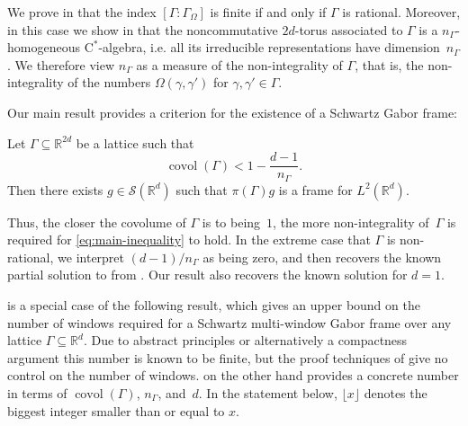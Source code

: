 \documentclass[reqno, a4paper]{amsart}
\numberwithin{equation}{section}
\newcommand{\R}{\mathbb{R}}   %
\newcommand{\ca}{$\mathrm{C}^*$-algebra}
\DeclareMathOperator{\covol}{covol}
\def\subgroup#1{{#1}_\Omega}
\begin{document}
We prove in  that the index $[\Gamma : \subgroup{\Gamma}]$ is finite if and only if $\Gamma$ is rational.
Moreover, in this case we show in  that the noncommutative $2d$-torus associated to $\Gamma$ is a $n_\Gamma$-homogeneous \ca{}, i.e. all its irreducible representations have dimension~$n_\Gamma$.
We therefore view $n_\Gamma$ as a measure of the non-integrality of $\Gamma$, that is, the non-integrality of the numbers $\Omega(\gamma,\gamma')$ for $\gamma,\gamma' \in \Gamma$.

Our main result provides a criterion for the existence of a Schwartz Gabor frame:

\begin{theorem}
\label{thm:1}
Let $\Gamma \subseteq \R^{2d}$ be a lattice such that
\begin{equation}
\label{eq:main-inequality}
\covol(\Gamma) < 1 - \frac{d-1}{n_\Gamma}.
\end{equation}
Then there exists $g \in \mathcal{S}(\R^d)$ such that $\pi(\Gamma)g$ is a frame for $L^2(\R^d)$.
\end{theorem}

Thus, the closer the covolume of $\Gamma$ is to being~$1$, the more non-integrality of~$\Gamma$ is required for \eqref{eq:main-inequality} to hold. 
In the extreme case that $\Gamma$ is non-rational, we interpret $(d-1)/n_\Gamma$ as being zero, and then  recovers the known partial solution to  from \cite[Theorem~5.4]{jalu20}. 
Our result also recovers the known solution for $d=1$.

 is a special case of the following result, which gives an upper bound on the number of windows required for a Schwartz multi-window Gabor frame over any lattice $\Gamma \subseteq \R^d$. Due to abstract principles \cite[Theorem~4.5]{lu09} or alternatively a compactness argument \cite[Proposition~6.4]{beenva22} this number is known to be finite, but the proof techniques of \cite{lu09,beenva22} give no control on the number of windows. 
 on the other hand provides a concrete number in terms of $\covol(\Gamma)$, $n_\Gamma$, and~$d$. In the statement below, $\lfloor x \rfloor$ denotes the biggest integer smaller than or equal to $x$.
\end{document}
